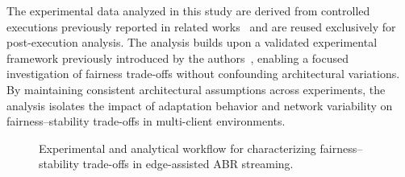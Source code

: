 \documentclass[conference,a4paper]{IEEEtran}
\begin{document}
    The experimental data analyzed in this study are derived from controlled executions previously reported in related works~\cite{de2025joint,de2025fairness} and are reused exclusively for post-execution analysis. The analysis builds upon a validated experimental framework previously introduced by the authors~\cite{de2025joint,de2025fairness}, enabling a focused investigation of fairness trade-offs without confounding architectural variations. By maintaining consistent architectural assumptions across experiments, the analysis isolates the impact of adaptation behavior and network variability on fairness–stability trade-offs in multi-client environments.


    \begin{figure}[t]
        \centering
        \caption{Experimental and analytical workflow for characterizing fairness--stability trade-offs in edge-assisted ABR streaming.}
        \label{fig:methodology_flowchart}
        \vspace{-0.2cm}
    \end{figure}
\end{document}
